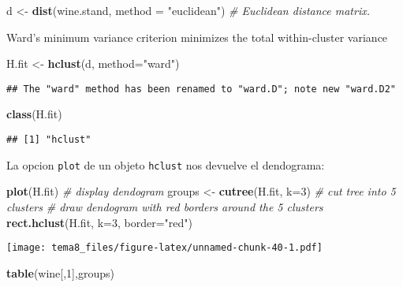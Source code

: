 \documentclass[]{article}
\newenvironment{Shaded}{\begin{snugshade}}{\end{snugshade}}
\newcommand{\KeywordTok}[1]{\textcolor[rgb]{0.13,0.29,0.53}{\textbf{{#1}}}}
\newcommand{\DataTypeTok}[1]{\textcolor[rgb]{0.13,0.29,0.53}{{#1}}}
\newcommand{\DecValTok}[1]{\textcolor[rgb]{0.00,0.00,0.81}{{#1}}}
\newcommand{\StringTok}[1]{\textcolor[rgb]{0.31,0.60,0.02}{{#1}}}
\newcommand{\CommentTok}[1]{\textcolor[rgb]{0.56,0.35,0.01}{\textit{{#1}}}}
\newcommand{\NormalTok}[1]{{#1}}
\numberwithin{equation}{section}
\begin{document}
\begin{Shaded}
\begin{Highlighting}[]
\NormalTok{d <-}\StringTok{ }\KeywordTok{dist}\NormalTok{(wine.stand, }\DataTypeTok{method =} \StringTok{"euclidean"}\NormalTok{) }\CommentTok{# Euclidean distance matrix.}
\end{Highlighting}
\end{Shaded}

Ward's minimum variance criterion minimizes the total within-cluster
variance

\begin{Shaded}
\begin{Highlighting}[]
\NormalTok{H.fit <-}\StringTok{ }\KeywordTok{hclust}\NormalTok{(d, }\DataTypeTok{method=}\StringTok{"ward"}\NormalTok{)}
\end{Highlighting}
\end{Shaded}

\begin{verbatim}
## The "ward" method has been renamed to "ward.D"; note new "ward.D2"
\end{verbatim}

\begin{Shaded}
\begin{Highlighting}[]
\KeywordTok{class}\NormalTok{(H.fit)}
\end{Highlighting}
\end{Shaded}

\begin{verbatim}
## [1] "hclust"
\end{verbatim}

La opcion \texttt{plot} de un objeto \texttt{hclust} nos devuelve el
dendograma:

\begin{Shaded}
\begin{Highlighting}[]
\KeywordTok{plot}\NormalTok{(H.fit) }\CommentTok{# display dendogram}
\NormalTok{groups <-}\StringTok{ }\KeywordTok{cutree}\NormalTok{(H.fit, }\DataTypeTok{k=}\DecValTok{3}\NormalTok{) }\CommentTok{# cut tree into 5 clusters}
\CommentTok{# draw dendogram with red borders around the 5 clusters}
\KeywordTok{rect.hclust}\NormalTok{(H.fit, }\DataTypeTok{k=}\DecValTok{3}\NormalTok{, }\DataTypeTok{border=}\StringTok{"red"}\NormalTok{) }
\end{Highlighting}
\end{Shaded}

\texttt{[image: tema8\_files/figure-latex/unnamed-chunk-40-1.pdf]}

\begin{Shaded}
\begin{Highlighting}[]
\KeywordTok{table}\NormalTok{(wine[,}\DecValTok{1}\NormalTok{],groups)}
\end{Highlighting}
\end{Shaded}
\end{document}
